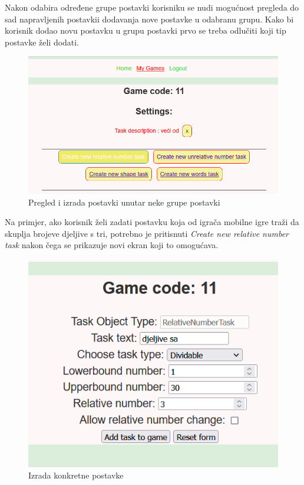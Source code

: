 \documentclass[times, utf8, zavrsni, numeric]{fer}
\begin{document}
	 Nakon odabira određene grupe postavki korisniku se nudi mogućnost pregleda do sad napravljenih postavkii dodavanja nove postavke u odabranu grupu. Kako bi korisnik dodao novu postavku u grupu postavki prvo se treba odlučiti koji 
	 tip postavke želi dodati. 
	 	\begin{figure}[H]
			\includegraphics[scale = 0.7]{"slike/zadavanjepostavki.png"} 
			\centering
			\caption{Pregled i izrada postavki unutar neke grupe postavki}
			\label{fig:pregledpostavki}
		\end{figure}
	Na primjer, ako korisnik želi zadati postavku koja od igrača mobilne igre traži da skuplja brojeve djeljive s tri, potrebno je pritisnuti \textit{Create new relative number task} nakon čega se prikazuje novi ekran koji to omogućava.
	\begin{figure}[H]
		\includegraphics[scale = 0.9]{"slike/zadavanjekonkretnepostavke.png"} 
		\centering
		\caption{Izrada konkretne postavke}
		\label{fig:izradapostavkedjeljenje}
	\end{figure}
		
\end{document}
